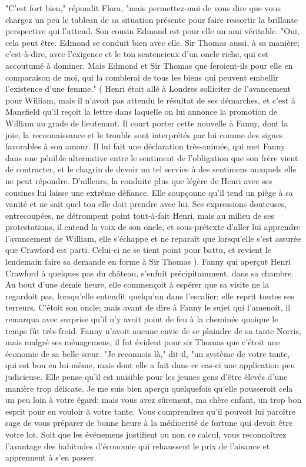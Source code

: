 "C'est fort bien," répondit Flora, "mais permettez-moi de vous dire que vous chargez un peu le tableau de sa situation présente pour faire ressortir la brillante perspective qui l'attend. Son cousin Edmond est pour elle un ami véritable.
"Oui, cela peut être. Edmond se conduit bien avec elle. Sir Thomas aussi, à sa manière; c'est-à-dire, avec l'exigence et le ton sentencieux d'un oncle riche, qui est accoutumé à dominer. Mais Edmond et Sir Thomas que feroient-ils pour elle en comparaison de moi, qui la comblerai de tous les biens qui peuvent embellir l'existence d'une femme."
( Henri étoit allé à Londres solliciter de l'avancement pour William, mais il n'avoit pas attendu le résultat de ses démarches, et\setcounter{page}{263} c'est à Mansfield qu'il reçoit la lettre dans laquelle on lui annonce la promotion de William au grade de lieutenant. Il court porter cette nouvelle à Fanny, dont la joie, la reconnaissance et le trouble sont interprétés par lui comme des signes favorables à son amour. Il lui fait une déclaration très-animée, qui met Fanny dans une pénible alternative entre le sentiment de l'obligation que son frère vient de contracter, et le chagrin de devoir un tel service à des sentimens auxquels elle ne peut répondre. D'ailleurs, la conduite plus que légère de Henri avec ses cousines lui laisse une extrême défiance. Elle soupçonne qu'il tend un piège à sa vanité et ne sait quel ton elle doit prendre avec lui. Ses expressions douteuses, entrecoupées, ne détrompent point tout-à-fait Henri, mais au milieu de ses protestations, il entend la voix de son oncle, et sous-prétexte d'aller lui apprendre l'avancement de William, elle s'échappe et ne reparaît que lorsqu'elle s'est assurée que Crawford est parti. Celui-ci ne se tient point pour battu, et revient le lendemain faire sa demande en forme à Sir Thomas ).
Fanny qui aperçut Henri Crawford à quelques pas du château, s'enfuit précipitamment.\setcounter{page}{264} dans sa chambre. Au bout d'une demie heure, elle commençoit à espérer que sa visite ne la regardoit pas, lorsqu'elle entendit quelqu'un dans l'escalier; elle reprit toutes ses terreurs. C'étoit son oncle; mais avant de dire à Fanny le sujet qui l'amenoit, il remarqua avec surprise qu'il n'y avoit point de feu à la cheminée quoique le temps fût très-froid.
Fanny n'avoit aucune envie de se plaindre de sa tante Norris, mais malgré ses ménagemens, il fut évident pour sir Thomas que c'étoit une économie de sa belle-sœur.
"Je reconnois là," dit-il, "un système de votre tante, qui est bon en lui-même, mais dont elle a fait dans ce cas-ci une application peu judicieuse. Elle pense qu'il est nuisible pour les jeunes gens d'être élevés d'une manière trop délicate. Je me suis bien aperçu quelquefois qu'elle pousseroit cela un peu loin à votre égard; mais vous avez sûrement, ma chère enfant, un trop bon esprit pour en vouloir à votre tante. Vous comprendrez qu'il pouvoit lui paroître sage de vous préparer de bonne heure à la médiocrité de fortune qui devoit être votre lot. Soit que les événemens justifient ou non ce calcul, vous reconnoîtrez l'avantage des habitudes\setcounter{page}{265} d'économie qui rehaussent le prix de l'aisance et apprennent à s'en passer.
